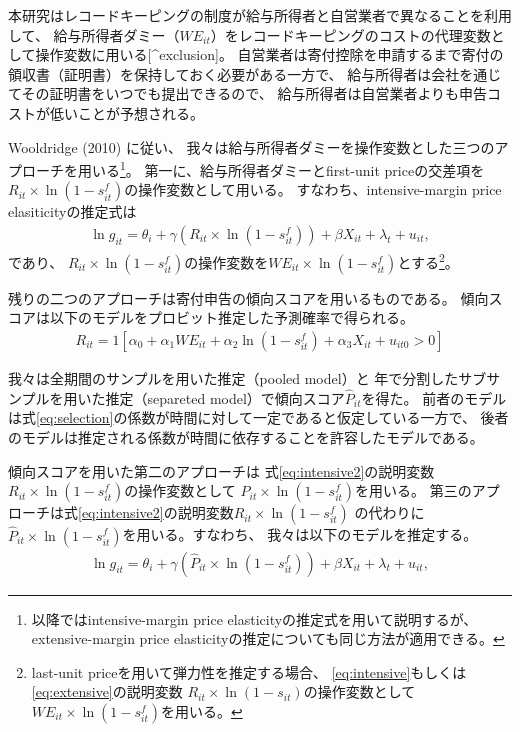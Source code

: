 \documentclass[
  11pt,
  a4paper,
]{article}
\begin{document}
本研究はレコードキーピングの制度が給与所得者と自営業者で異なることを利用して、
給与所得者ダミー（\(WE_{it}\)）をレコードキーピングのコストの代理変数として操作変数に用いる{[}\^{}exclusion{]}。
自営業者は寄付控除を申請するまで寄付の領収書（証明書）を保持しておく必要がある一方で、
給与所得者は会社を通じてその証明書をいつでも提出できるので、
給与所得者は自営業者よりも申告コストが低いことが予想される。

Wooldridge (2010) に従い、
我々は給与所得者ダミーを操作変数とした三つのアプローチを用いる\footnote{以降ではintensive-margin price elasticityの推定式を用いて説明するが、
  extensive-margin price elasticityの推定についても同じ方法が適用できる。}。
第一に、給与所得者ダミーとfirst-unit priceの交差項を
\(R_{it} \times \ln (1 - s^f_{it})\)の操作変数として用いる。
すなわち、intensive-margin price elasiticityの推定式は
\begin{align}
  \ln g_{it} = \theta_i + \gamma (R_{it} \times \ln (1 - s^f_{it}))
    + \beta X_{it} + \lambda_t + u_{it}, \label{eq:intensive2}
\end{align}
であり、
\(R_{it} \times \ln (1 - s^f_{it})\)の操作変数を\(WE_{it} \times \ln(1 - s^f_{it})\)とする\footnote{last-unit priceを用いて弾力性を推定する場合、
  \eqref{eq:intensive}もしくは\eqref{eq:extensive}の説明変数
  \(R_{it} \times \ln (1 - s_{it})\)の操作変数として
  \(WE_{it} \times \ln(1 - s^f_{it})\)を用いる。}。

残りの二つのアプローチは寄付申告の傾向スコアを用いるものである。
傾向スコアは以下のモデルをプロビット推定した予測確率で得られる。
\begin{align}
  R_{it} = 1[
    \alpha_0 + \alpha_1 WE_{it} + \alpha_2 \ln(1 - s^f_{it})
    + \alpha_3 X_{it} + u_{it0} > 0
  ] \label{eq:selection}
\end{align}

我々は全期間のサンプルを用いた推定（pooled model）と
年で分割したサブサンプルを用いた推定（separeted model）で傾向スコア\(\hat{P}_{it}\)を得た。
前者のモデルは式\eqref{eq:selection}の係数が時間に対して一定であると仮定している一方で、
後者のモデルは推定される係数が時間に依存することを許容したモデルである。

傾向スコアを用いた第二のアプローチは
式\eqref{eq:intensive2}の説明変数\(R_{it} \times \ln (1 - s^f_{it})\)の操作変数として
\(\hat{P}_{it} \times \ln (1 - s^f_{it})\)を用いる。
第三のアプローチは式\eqref{eq:intensive2}の説明変数\(R_{it} \times \ln (1 - s^f_{it})\)
の代わりに\(\hat{P}_{it} \times \ln (1 - s^f_{it})\)を用いる。すなわち、
我々は以下のモデルを推定する。
\begin{align}
  \ln g_{it} = \theta_i + \gamma (\hat{P}_{it} \times \ln (1 - s^f_{it}))
    + \beta X_{it} + \lambda_t + u_{it}, \label{eq:intensive3}
\end{align}
\end{document}
